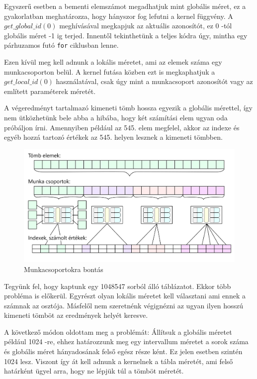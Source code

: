 
Egyszerű esetben a bementi elemszámot megadhatjuk mint globális méret, ez a gyakorlatban meghatározza, hogy hányszor fog lefutni a kernel függvény. A $get\_global\_id(0)$ meghívásával megkapjuk az aktuális azonosítót, ez 0 -tól globális méret -1 ig terjed. Innentől tekinthetünk a teljes kódra úgy, mintha egy párhuzamos futó \texttt{for} ciklusban lenne.

Ezen kívül meg kell adnunk a lokális méretet, ami az elemek száma egy munkacsoporton belül. A kernel futása közben ezt is megkaphatjuk a $get\_local\_id(0)$ használatával, csak úgy mint a munkacsoport azonosítót vagy az említett paraméterek méretét.

A végeredményt tartalmazó kimeneti tömb hossza egyezik a globális mérettel, így nem ütközhetünk bele abba a hibába, hogy két számítási elem ugyan oda próbáljon írni. Amennyiben például az 545. elem megfelel, akkor az indexe és egyéb hozzá tartozó értékek az 545. helyen lesznek a kimeneti tömbben.

\begin{figure}[h!]
\centering
\includegraphics[width=\textwidth]{images/workgroups_black.png}
\caption{Munkacsoportokra bontás}
\label{fig:opencl}
\end{figure}

\newpage

Tegyünk fel, hogy kaptunk egy 1048547 sorból álló táblázatot. Ekkor több probléma is előkerül. Egyrészt olyan lokális méretet kell választani ami ennek a számnak az osztója. Másfelől nem szeretnénk végignézni az ugyan ilyen hosszú kimeneti tömböt az eredmények helyét keresve.

A következő módon oldottam meg a problémát: Állítsuk a globális méretet például 1024 -re, ehhez határozzunk meg egy intervallum méretet a sorok száma és globális méret hányadosának felső egész része ként. Ez jelen esetben szintén 1024 lesz. Viszont így át kell adnunk a kernelnek a tábla méretét, ami felső határként ügyel arra, hogy ne lépjük túl a tömböt méretét.

